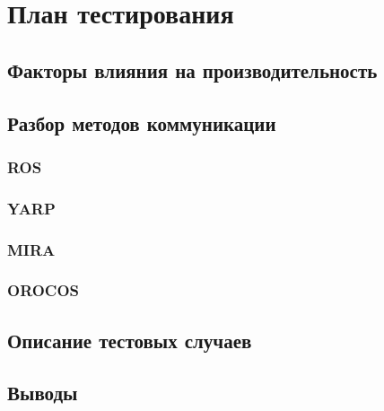 \chapter{План тестирования}
\section{Факторы влияния на производительность \marm}
\section{Разбор методов коммуникации \marm}
	\subsection{ROS}
	\subsection{YARP}
	\subsection{MIRA}
	\subsection{OROCOS}
\section{Описание тестовых случаев}
\section{Выводы}
